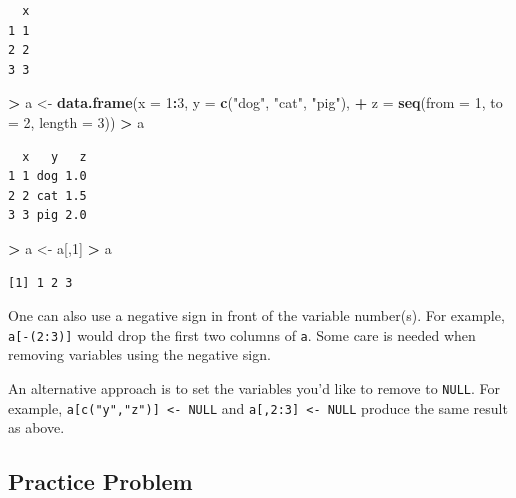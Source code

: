 \documentclass[
]{krantz}
\makeatletter
\newenvironment{Shaded}{\begin{snugshade}}{\end{snugshade}}
\newcommand{\DataTypeTok}[1]{\textcolor[rgb]{0.27,0.27,0.27}{#1}}
\newcommand{\DecValTok}[1]{\textcolor[rgb]{0.06,0.06,0.06}{#1}}
\newcommand{\KeywordTok}[1]{\textcolor[rgb]{0.27,0.27,0.27}{\textbf{#1}}}
\newcommand{\NormalTok}[1]{#1}
\newcommand{\OperatorTok}[1]{\textcolor[rgb]{0.43,0.43,0.43}{\textbf{#1}}}
\newcommand{\StringTok}[1]{\textcolor[rgb]{0.5,0.5,0.5}{#1}}
\newenvironment{kframe}{%
\medskip{}
\setlength{\fboxsep}{.8em}
 \def\at@end@of@kframe{}%
 \ifinner\ifhmode%
  \def\at@end@of@kframe{\end{minipage}}%
  \begin{minipage}{\columnwidth}%
 \fi\fi%
 \def\FrameCommand##1{\hskip\@totalleftmargin \hskip-\fboxsep
 \colorbox{shadecolor}{##1}\hskip-\fboxsep
     \hskip-\linewidth \hskip-\@totalleftmargin \hskip\columnwidth}%
 \MakeFramed {\advance\hsize-\width
   \@totalleftmargin\z@ \linewidth\hsize
   \@setminipage}}%
 {\par\unskip\endMakeFramed%
 \at@end@of@kframe}
\renewenvironment{Shaded}{\begin{kframe}}{\end{kframe}}
\makeatother
\begin{document}
\begin{verbatim}
  x
1 1
2 2
3 3
\end{verbatim}

\begin{Shaded}
\begin{Highlighting}[]
\OperatorTok{\textgreater{}}\StringTok{ }\NormalTok{a \textless{}{-}}\StringTok{ }\KeywordTok{data.frame}\NormalTok{(}\DataTypeTok{x =} \DecValTok{1}\OperatorTok{:}\DecValTok{3}\NormalTok{, }\DataTypeTok{y =} \KeywordTok{c}\NormalTok{(}\StringTok{"dog"}\NormalTok{, }\StringTok{"cat"}\NormalTok{, }\StringTok{"pig"}\NormalTok{), }
\OperatorTok{+}\StringTok{                 }\DataTypeTok{z =} \KeywordTok{seq}\NormalTok{(}\DataTypeTok{from =} \DecValTok{1}\NormalTok{, }\DataTypeTok{to =} \DecValTok{2}\NormalTok{, }\DataTypeTok{length =} \DecValTok{3}\NormalTok{))}
\OperatorTok{\textgreater{}}\StringTok{ }\NormalTok{a }
\end{Highlighting}
\end{Shaded}

\begin{verbatim}
  x   y   z
1 1 dog 1.0
2 2 cat 1.5
3 3 pig 2.0
\end{verbatim}

\begin{Shaded}
\begin{Highlighting}[]
\OperatorTok{\textgreater{}}\StringTok{ }\NormalTok{a \textless{}{-}}\StringTok{ }\NormalTok{a[,}\DecValTok{1}\NormalTok{]}
\OperatorTok{\textgreater{}}\StringTok{ }\NormalTok{a}
\end{Highlighting}
\end{Shaded}

\begin{verbatim}
[1] 1 2 3
\end{verbatim}

One can also use a negative sign in front of the variable number(s). For example, \texttt{a{[}-(2:3){]}} would drop the first two columns of \texttt{a}. Some care is needed when removing variables using the negative sign.

An alternative approach is to set the variables you'd like to remove to \texttt{NULL}. For example, \texttt{a{[}c("y","z"){]}\ \textless{}-\ NULL} and \texttt{a{[},2:3{]}\ \textless{}-\ NULL} produce the same result as above.

\hypertarget{practice-problem-6}{%
\subsection{Practice Problem}\label{practice-problem-6}}
\end{document}

